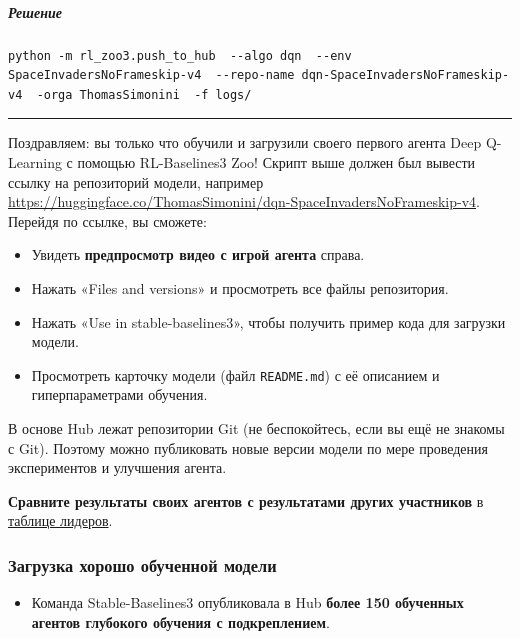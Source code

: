 \documentclass[11pt,a4paper]{article}
\begin{document}
\subparagraph{Решение}\label{solution-2}

\begin{lstlisting}
python -m rl_zoo3.push_to_hub  --algo dqn  --env SpaceInvadersNoFrameskip-v4  --repo-name dqn-SpaceInvadersNoFrameskip-v4  -orga ThomasSimonini  -f logs/
\end{lstlisting}

\begin{center}\rule{0.5\linewidth}{0.5pt}\end{center}

Поздравляем: вы только что обучили и загрузили своего первого агента Deep Q-Learning с помощью RL-Baselines3 Zoo! Скрипт выше должен был вывести ссылку на репозиторий модели, например \url{https://huggingface.co/ThomasSimonini/dqn-SpaceInvadersNoFrameskip-v4}. Перейдя по ссылке, вы сможете:

\begin{itemize}
\tightlist
\item
Увидеть \textbf{предпросмотр видео с игрой агента} справа.
\item
Нажать «Files and versions» и просмотреть все файлы репозитория.
\item
Нажать «Use in stable-baselines3», чтобы получить пример кода для загрузки модели.
\item
Просмотреть карточку модели (файл \texttt{README.md}) с её описанием и гиперпараметрами обучения.
\end{itemize}

В основе Hub лежат репозитории Git (не беспокойтесь, если вы ещё не знакомы с Git). Поэтому можно публиковать новые версии модели по мере проведения экспериментов и улучшения агента.

\textbf{Сравните результаты своих агентов с результатами других участников} в \href{https://huggingface.co/spaces/huggingface-projects/Deep-Reinforcement-Learning-Leaderboard}{таблице лидеров}.

\subsubsection{Загрузка хорошо обученной модели}\label{load-a-powerful-trained-model}

\begin{itemize}
\tightlist
\item
Команда Stable-Baselines3 опубликовала в Hub \textbf{более 150 обученных агентов глубокого обучения с подкреплением}.
\end{itemize}
\end{document}
